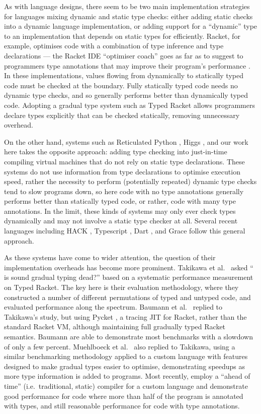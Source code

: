 As with language designs, there seem to be two main implementation
strategies for languages mixing dynamic and static type checks: either
adding static checks into a dynamic language implementation, or adding
support for a ``dynamic'' type to an implementation that depends on
static types for efficiently. Racket, for example, optimises code with
a combination of type inference and type declarations --- the Racket
IDE ``optimiser coach'' goes as far as to suggest to programmers type
annotations that may improve their program's performance
\cite{optimizerCoach2012}. In these implementations, values flowing
from dynamically to statically typed code must be checked at the
boundary.  Fully statically typed code needs no dynamic type checks,
and so generally performs better than dynamically typed code. Adopting
a gradual type system such as Typed Racket \cite{typedScheme08} allows
programmers declare types explicitly that can be checked statically,
removing unnecessary overhead.

On the other hand, systems such as Reticulated Python
\cite{reticPython2014}, Higgs \cite{Richards2017}, and our
work here takes the opposite approach: adding type checking into
just-in-time compiling virtual machines that do not rely on static
type declarations. These systems do not use information from type
declarations to optimise execution speed, rather the necessity to
perform (potentially repeated) dynamic type checks tend to slow
programs down, so here code with no type annotations generally
performs better than statically typed code, or rather, code with many
type annotations. In the limit, these kinds of systems may only ever
check types dynamically and may not involve a static type checker at
all.  Several recent languages including HACK \cite{HACK}, Typescript
\cite{typeScriptECOOP,typeScriptTyping}, Dart \cite{dartbook}, and Grace
\cite{graceOnward12} follow this general approach.

As these systems have come to wider attention, the question of their
implementation overheads has become more prominent.  
Takikawa et al.\ \cite{Takikawa2016} asked `` is sound gradual typing
dead?'' based on a systematic performance measurement on Typed Racket.
The key here is their evaluation methodology, where they constructed a
number of different permutations of typed and untyped code, and
evaluated performance along the spectrum.
Baumann et al.\ \cite{Bauman2017} replied to Takikawa's study, but
using Pycket \cite{Pycket2015}, a tracing JIT for Racket, rather
than the standard Racket VM, although maintaining full gradually typed
Racket semantics. Baumann are able to demonstrate most benchmarks
with a slowdown of only a few percent.
Muehlboeck et al.\ \cite{Muehlboeck2017} also replied to Takikawa, 
using a similar benchmarking methodology applied to a custom language
with features designed to make gradual types easier to optimise, 
demonstrating speedups as more type information is added to programs. 
Most recently, \citet{Kuhlenschmidt:2018:preprint} employ a
``ahead of time'' (i.e.\ traditional, static) compiler for a custom
language and demonstrate good performance for code where more than
half of the program is annotated with types, and still reasonable
performance for code with type annotations. 

